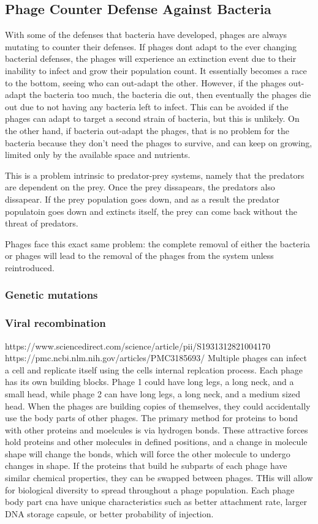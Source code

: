 \subsection{Phage Counter Defense Against Bacteria}
With some of the defenses that bacteria have developed, phages are always mutating to counter their defenses. 
If phages dont adapt to the ever changing bacterial defenses, the phages will experience an extinction event due to their inability to infect and grow their population count. 
It essentially becomes a race to the bottom, seeing who can out-adapt the other. 
However, if the phages out-adapt the bacteria too much, the bacteria die out, then eventually the phages die out due to not having any bacteria left to infect. 
This can be avoided if the phages can adapt to target a second strain of bacteria, but this is unlikely. 
On the other hand, if bacteria out-adapt the phages, that is no problem for the bacteria because they don't need the phages to survive, and can keep on growing, limited only by the available space and nutrients. 

This is a problem intrinsic to predator-prey systems, namely that the predators are dependent on the prey. 
Once the prey dissapears, the predators also dissapear. 
If the prey population goes down, and as a result the predator populatoin goes down and extincts itself, the prey can come back without the threat of predators. 

Phages face this exact same problem: the complete removal of either the bacteria or phages will lead to the removal of the phages from the system unless reintroduced. 

\subsubsection{Genetic mutations}

\subsubsection{Viral recombination}
https://www.sciencedirect.com/science/article/pii/S1931312821004170
https://pmc.ncbi.nlm.nih.gov/articles/PMC3185693/
Multiple phages can infect a cell and replicate itself using the cells internal replcation process. 
Each phage has its own building blocks. 
Phage 1 could have long legs, a long neck, and a small head, while phage 2 can have long legs, a long neck, and a medium sized head. 
When the phages are building copies of themselves, they could accidentally use the body parts of other phages. 
The primary method for proteins to bond with other proteins and moelcules is via hydrogen bonds. 
These attractive forces hold proteins and other molecules in defined positions, and a change in molecule shape will change the bonds, which will force the other molecule to undergo changes in shape. 
If the proteins that build he subparts of each phage have similar chemical properties, they can be swapped between phages. 
THis will allow for biological diversity to spread throughout a phage population. 
Each phage body part cna have unique characteristics such as better attachment rate, larger DNA storage capsule, or better probability of injection. 




